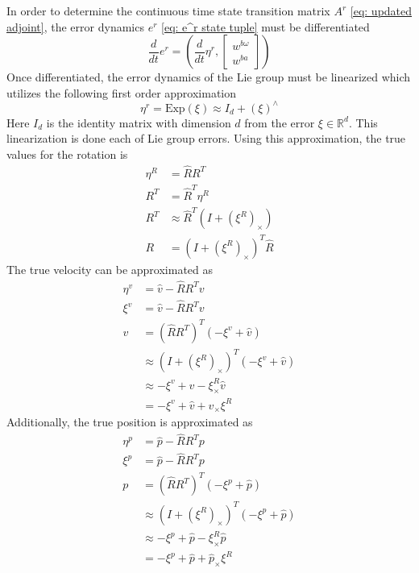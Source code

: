 In order to determine the continuous time state transition matrix $A^r$ \eqref{eq: updated adjoint}, the error dynamics $e^r$ \eqref{eq: e^r state tuple} must be differentiated
\begin{equation}
    \frac{d}{dt} e^r = (\frac{d}{dt} \eta^r, \begin{bmatrix}
        w^{b \omega} \\
        w^{b a}
    \end{bmatrix})
    \label{eq: e derivative}
\end{equation}
Once differentiated, the error dynamics of the Lie group must be linearized which utilizes the following first order approximation 
\begin{equation}
    \eta^r = \text{Exp}(\xi) \approx I_d + (\xi)^{\wedge}
    \label{eq: eta first order approx}
\end{equation}
Here $I_d$ is the identity matrix with dimension $d$ from the error $\xi \in \mathbb{R}^d$. This linearization is done each of Lie group errors. Using this approximation, the true values for the rotation is
\begin{equation}
    \begin{split}
        \eta^R &= \hat{R} R^T  \\
        R^T  &= \hat{R}^T \eta^R \\
        R^T & \approx \hat{R}^T (I + (\xi^R)_{\times})\\
        R &= (I + (\xi^R)_{\times})^T \hat{R}
        \label{eq: approx true R InEKF}
    \end{split}
\end{equation}
The true velocity can be approximated as
\begin{equation}
    \begin{split}
        \eta^v & = \hat{v} - \hat{R} R^T v \\ 
        \xi^v & = \hat{v} - \hat{R} R^T v \\ 
        v &= (\hat{R} R^T)^T (-\xi^v + \hat{v}) \\
        & \approx (I + (\xi^R)_{\times})^T (-\xi^v + \hat{v}) \\
        & \approx -\xi^v + \hat{v} - \xi^R_{\times} \hat{v} \\
        & = -\xi^v + \hat{v} + \hat{v}_{\times} \xi^R
        \label{eq: approx true v InEKF}        
    \end{split}
\end{equation}
Additionally, the true position is approximated as
\begin{equation}
    \begin{split}
        \eta^p & = \hat{p} - \hat{R} R^T p \\ 
        \xi^p & = \hat{p} - \hat{R} R^T p \\ 
        p &= (\hat{R} R^T)^T (-\xi^p + \hat{p}) \\
        & \approx (I + (\xi^R)_{\times})^T (-\xi^p + \hat{p}) \\
        & \approx -\xi^p + \hat{p} - \xi^R_{\times} \hat{p} \\
        & = -\xi^p + \hat{p} + \hat{p}_{\times} \xi^R
        \label{eq: approx true p InEKF}        
    \end{split}
\end{equation}
